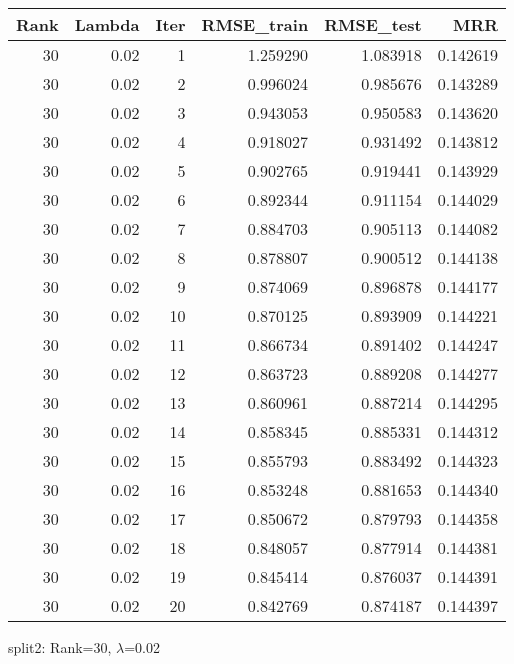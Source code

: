 \begin{tabular}{rrrrrr}
\toprule
 Rank &  Lambda &  Iter &  RMSE\_train &  RMSE\_test &       MRR \\
\midrule
   30 &    0.02 &     1 &    1.259290 &   1.083918 &  0.142619 \\
   30 &    0.02 &     2 &    0.996024 &   0.985676 &  0.143289 \\
   30 &    0.02 &     3 &    0.943053 &   0.950583 &  0.143620 \\
   30 &    0.02 &     4 &    0.918027 &   0.931492 &  0.143812 \\
   30 &    0.02 &     5 &    0.902765 &   0.919441 &  0.143929 \\
   30 &    0.02 &     6 &    0.892344 &   0.911154 &  0.144029 \\
   30 &    0.02 &     7 &    0.884703 &   0.905113 &  0.144082 \\
   30 &    0.02 &     8 &    0.878807 &   0.900512 &  0.144138 \\
   30 &    0.02 &     9 &    0.874069 &   0.896878 &  0.144177 \\
   30 &    0.02 &    10 &    0.870125 &   0.893909 &  0.144221 \\
   30 &    0.02 &    11 &    0.866734 &   0.891402 &  0.144247 \\
   30 &    0.02 &    12 &    0.863723 &   0.889208 &  0.144277 \\
   30 &    0.02 &    13 &    0.860961 &   0.887214 &  0.144295 \\
   30 &    0.02 &    14 &    0.858345 &   0.885331 &  0.144312 \\
   30 &    0.02 &    15 &    0.855793 &   0.883492 &  0.144323 \\
   30 &    0.02 &    16 &    0.853248 &   0.881653 &  0.144340 \\
   30 &    0.02 &    17 &    0.850672 &   0.879793 &  0.144358 \\
   30 &    0.02 &    18 &    0.848057 &   0.877914 &  0.144381 \\
   30 &    0.02 &    19 &    0.845414 &   0.876037 &  0.144391 \\
   30 &    0.02 &    20 &    0.842769 &   0.874187 &  0.144397 \\
\bottomrule
\end{tabular}

\caption{split2: Rank=30, $\lambda$=0.02}
